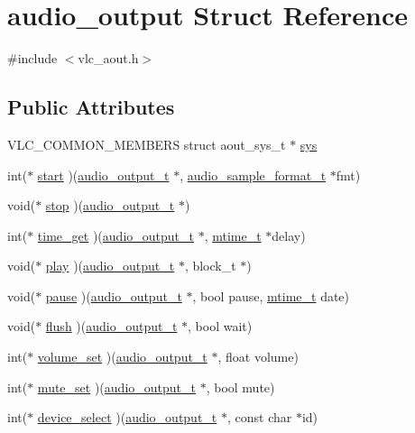 \hypertarget{structaudio__output}{}\section{audio\+\_\+output Struct Reference}
\label{structaudio__output}


{\ttfamily \#include $<$vlc\+\_\+aout.\+h$>$}

\subsection*{Public Attributes}
\begin{DoxyCompactItemize}
\item 
V\+L\+C\+\_\+\+C\+O\+M\+M\+O\+N\+\_\+\+M\+E\+M\+B\+E\+RS struct aout\+\_\+sys\+\_\+t $\ast$ \hyperlink{structaudio__output_a88143cf6018fefbba4a9a0e8284067b9}{sys}
\item 
int($\ast$ \hyperlink{structaudio__output_a41bc9e8671e11adb721781af2a277cc7}{start} )(\hyperlink{structaudio__output}{audio\+\_\+output\+\_\+t} $\ast$, \hyperlink{structaudio__format__t}{audio\+\_\+sample\+\_\+format\+\_\+t} $\ast$fmt)
\item 
void($\ast$ \hyperlink{structaudio__output_ad045b1c68f0e60ed577046bd77e3591b}{stop} )(\hyperlink{structaudio__output}{audio\+\_\+output\+\_\+t} $\ast$)
\item 
int($\ast$ \hyperlink{structaudio__output_a91330839cf46e7f8ef80dc61f5d490ad}{time\+\_\+get} )(\hyperlink{structaudio__output}{audio\+\_\+output\+\_\+t} $\ast$, \hyperlink{vlc__common_8h_a996e47c5ea061215703c26738351279e}{mtime\+\_\+t} $\ast$delay)
\item 
void($\ast$ \hyperlink{structaudio__output_aed30544225e26db43e161ac68782fb48}{play} )(\hyperlink{structaudio__output}{audio\+\_\+output\+\_\+t} $\ast$, block\+\_\+t $\ast$)
\item 
void($\ast$ \hyperlink{structaudio__output_aa43086ee0feb50b08ebff9b6f4ccb643}{pause} )(\hyperlink{structaudio__output}{audio\+\_\+output\+\_\+t} $\ast$, bool pause, \hyperlink{vlc__common_8h_a996e47c5ea061215703c26738351279e}{mtime\+\_\+t} date)
\item 
void($\ast$ \hyperlink{structaudio__output_ac88458a193c7b6656f043df672f3687b}{flush} )(\hyperlink{structaudio__output}{audio\+\_\+output\+\_\+t} $\ast$, bool wait)
\item 
int($\ast$ \hyperlink{structaudio__output_a38d3e01f0ae4d0a266510a7321b3a9f2}{volume\+\_\+set} )(\hyperlink{structaudio__output}{audio\+\_\+output\+\_\+t} $\ast$, float volume)
\item 
int($\ast$ \hyperlink{structaudio__output_a9ed26f41b18750a73cd52b4c1b3e9369}{mute\+\_\+set} )(\hyperlink{structaudio__output}{audio\+\_\+output\+\_\+t} $\ast$, bool mute)
\item 
int($\ast$ \hyperlink{structaudio__output_a9e4f5e7ddf9fafe634225ca67de65b39}{device\+\_\+select} )(\hyperlink{structaudio__output}{audio\+\_\+output\+\_\+t} $\ast$, const char $\ast$id)
\end{DoxyCompactItemize}


